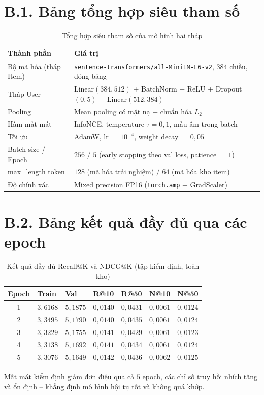 \section*{B.1. Bảng tổng hợp siêu tham số}

\begin{table}[H]
\centering
\caption{Tổng hợp siêu tham số của mô hình hai tháp}
\renewcommand{\arraystretch}{1.3}
\begin{tabularx}{\textwidth}{@{}l X@{}}
\toprule
\textbf{Thành phần} & \textbf{Giá trị} \\
\midrule
Bộ mã hóa (tháp Item) & \texttt{sentence-transformers/all-MiniLM-L6-v2}, $384$ chiều, đóng băng \\
Tháp User & Linear$(384,512)$ + BatchNorm + ReLU + Dropout$(0{,}5)$ + Linear$(512,384)$ \\
Pooling & Mean pooling có mặt nạ + chuẩn hóa $L_2$ \\
Hàm mất mát & InfoNCE, temperature $\tau = 0{,}1$, mẫu âm trong batch \\
Tối ưu & AdamW, lr $= 10^{-4}$, weight decay $= 0{,}05$ \\
Batch size / Epoch & $256$ / $5$ (early stopping theo val loss, patience $= 1$) \\
max\_length token & $128$ (mã hóa trải nghiệm) / $64$ (mã hóa kho item) \\
Độ chính xác & Mixed precision FP16 (\texttt{torch.amp} + GradScaler) \\
\bottomrule
\end{tabularx}
\end{table}

\section*{B.2. Bảng kết quả đầy đủ qua các epoch}

\begin{table}[H]
\centering
\caption{Kết quả đầy đủ Recall@K và NDCG@K (tập kiểm định, toàn kho)}
\renewcommand{\arraystretch}{1.3}
\begin{tabularx}{\textwidth}{@{}c X X X X X X@{}}
\toprule
\textbf{Epoch} & \textbf{Train} & \textbf{Val} & \textbf{R@10} & \textbf{R@50} &
\textbf{N@10} & \textbf{N@50} \\
\midrule
1 & $3{,}6168$ & $5{,}1875$ & $0{,}0140$ & $0{,}0431$ & $0{,}0061$ & $0{,}0124$ \\
2 & $3{,}3495$ & $5{,}1790$ & $0{,}0140$ & $0{,}0435$ & $0{,}0061$ & $0{,}0124$ \\
3 & $3{,}3229$ & $5{,}1755$ & $0{,}0141$ & $0{,}0429$ & $0{,}0061$ & $0{,}0123$ \\
4 & $3{,}3138$ & $5{,}1692$ & $0{,}0141$ & $0{,}0434$ & $0{,}0061$ & $0{,}0124$ \\
5 & $3{,}3076$ & $5{,}1649$ & $0{,}0142$ & $0{,}0436$ & $0{,}0062$ & $0{,}0125$ \\
\bottomrule
\end{tabularx}
\end{table}

Mất mát kiểm định giảm đơn điệu qua cả $5$ epoch, các chỉ số truy hồi nhích tăng và
ổn định -- khẳng định mô hình hội tụ tốt và không quá khớp.
